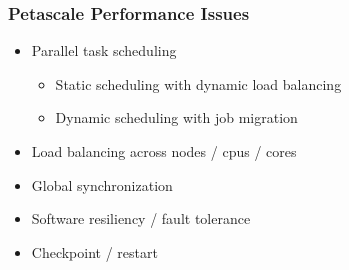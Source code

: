 \begin{frame}[fragile] \frametitle{Petascale Performance Issues}
   \begin{itemize}
      \item {}Parallel task scheduling
      \begin{itemize}
          \item {}Static scheduling with dynamic load balancing
          \item {}Dynamic scheduling with job migration
      \end{itemize}
      \item {}Load balancing across nodes / cpus / cores
      \item {}Global synchronization
      \item {}Software resiliency / fault tolerance
      \item {}Checkpoint / restart
   \end{itemize}
\end{frame}

